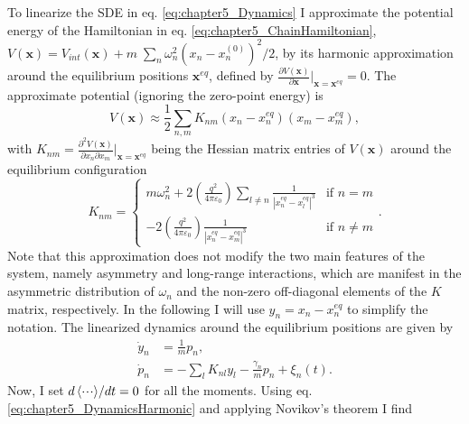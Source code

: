 To linearize the SDE in eq. \eqref{eq:chapter5_Dynamics} I approximate the potential energy of the Hamiltonian in eq. \eqref{eq:chapter5_ChainHamiltonian}, $V(\bm{x}) = V_{int}(\bm{x}) + m\;\sum_n \omega_n^2 (x_n-x_n^{(0)})^2/2$, by its harmonic approximation around the equilibrium positions $\bm{x}^{eq}$, defined by  $\frac{\partial V(\bm{x})}{\partial\bm{x}}\Big|_{\bm{x}=\bm{x}^{eq}} = 0$. The approximate potential (ignoring the zero-point energy) is
%
\begin{equation}
    V(\bm{x})\approx  \frac{1}{2} \sum_{n,m} K_{nm} (x_n-x_n^{eq})(x_m-x_m^{eq}),
\end{equation}
%
with $K_{nm} = \frac{\partial^2 V(\bm{x})}{\partial x_n \partial x_m}\Big|_{\bm{x}=\bm{x}^{eq}}$ being the Hessian matrix entries of $V(\bm{x})$ around the equilibrium configuration \cite{James1998}
%
\begin{equation}
    K_{nm} =
    \begin{cases}
        m \omega_n^2 + 2 \left(\frac{q^2}{4\pi\varepsilon_0}\right) \sum_{l \neq n  }\frac{1}{\left|x_n^{eq}-x_l^{eq}\right|^3} & \text{if  } n=m\\

         - 2 \left(\frac{q^2}{4\pi\varepsilon_0}\right) \frac{1}{\left|x_n^{eq}-x_m^{eq}\right|^3} & \text{if  } n \neq m
    \end{cases}.
\end{equation}
%
Note that this approximation does not modify the two main features of the system, namely asymmetry and long-range interactions, which are manifest in the asymmetric distribution of $\omega_n$ and the non-zero off-diagonal elements of the $K$ matrix, respectively. In the following I will use $y_n=x_n-x_n^{eq}$ to simplify the notation. The linearized dynamics around the equilibrium positions are given by
%
\begin{align}
  \dot{y}_n &= \frac{1}{m}p_n,\nonumber\\
  \dot{p}_n &= -\sum_{l}K_{nl}y_l- \frac{\gamma_n}{m}p_n + \xi_n(t).
  \label{eq:chapter5_DynamicsHarmonic}
\end{align}
%
Now, I set ${d\expval{\cdot\!\cdot\!\cdot}}/{dt} = 0$ for all the moments. Using eq. \eqref{eq:chapter5_DynamicsHarmonic} and applying Novikov's theorem I find

